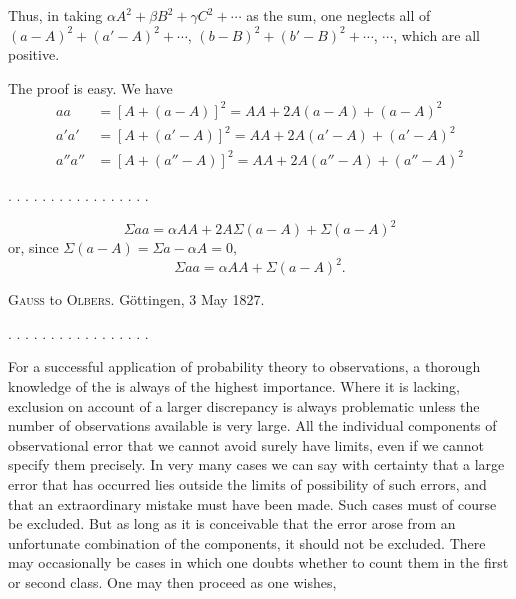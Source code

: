 Thus, in taking $\alpha A^2+\beta B^2+\gamma C^2+\cdots$ as the sum, one neglects all of $(a-A)^2+(a'-A)^2+\cdots$, $(b-B)^2+(b'-B)^2+\cdots$, $\cdots$, which are all positive.

The proof is easy. We have
\[
\begin{aligned}
aa &= [A+(a-A)]^2 = AA+2A(a-A)+(a-A)^2\\
a'a' &= [A+(a'-A)]^2 = AA+2A(a'-A)+(a'-A)^2\\
a''a'' &= [A+(a''-A)]^2 = AA+2A(a''-A)+(a''-A)^2
\end{aligned}
\]
\begin{center}
. . . . . . . . . . . . . . . . .
\end{center}
\[
\Sigma aa = \alpha AA+2A\Sigma(a-A)+\Sigma(a-A)^2
\]
or, since $\Sigma(a-A)=\Sigma a-\alpha A=0,$
\[
\Sigma aa = \alpha AA+\Sigma(a-A)^2.
\]
\begin{center}
\textsc{Gauss} to \textsc{Olbers}. Göttingen, 3 May 1827.
\end{center}

\begin{center}
. . . . . . . . . . . . . . . . .
\end{center}

For a successful application of probability theory to observations, a thorough knowledge of the  is always of the highest importance. Where it is lacking, exclusion on account of a larger discrepancy is always problematic unless the number of observations available is very large. All the individual components of observational error that we cannot avoid surely have limits, even if we cannot specify them precisely. In very many cases we can say with certainty that a large error that has occurred lies outside the limits of possibility of such errors, and that an extraordinary mistake must have been made. Such cases must of course be excluded. But as long as it is conceivable that the error arose from an unfortunate combination of the components, it should not be excluded. There may occasionally be cases in which one doubts whether to count them in the first or second class. One may then proceed as one wishes,
